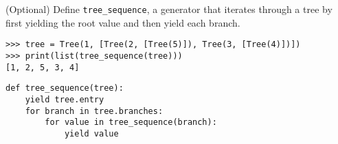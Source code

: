\question (Optional) Define \texttt{tree\_sequence}, a generator that iterates
through a tree by first yielding the root value and then yield each branch.

\begin{lstlisting}
>>> tree = Tree(1, [Tree(2, [Tree(5)]), Tree(3, [Tree(4)])])
>>> print(list(tree_sequence(tree)))
[1, 2, 5, 3, 4]
\end{lstlisting}

\begin{solution}[0.5in]
\begin{lstlisting}
def tree_sequence(tree):
	yield tree.entry
	for branch in tree.branches:
		for value in tree_sequence(branch):
			yield value
\end{lstlisting}
\end{solution}
